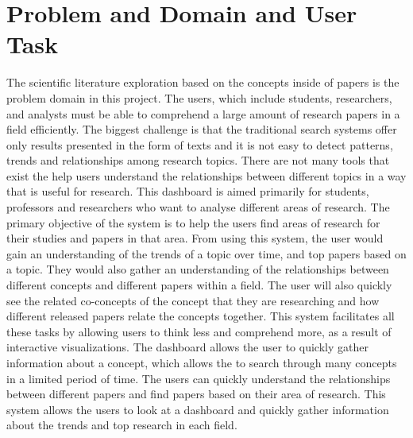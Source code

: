 \documentclass[sigconf]{acmart}
\begin{document}
\section{Problem and Domain and User Task}
The scientific literature exploration based on the concepts inside of papers is the problem domain in this project. The users, which include students, researchers, and analysts must be able to comprehend a large amount of research papers in a field efficiently.  The biggest challenge is that the traditional search systems offer only results presented in the form of texts and it is not easy to detect patterns, trends and relationships among research topics. There are not many tools that exist the help users understand the relationships between different topics in a way that is useful for research.  This dashboard is aimed primarily for students, professors and researchers who want to analyse different areas of research. The primary objective of the system is to help the users find areas of research for their studies and papers in that area. From using this system, the user would gain an understanding of the trends of a topic over time, and top papers based on a topic. They would also gather an understanding of the relationships between different concepts and different papers within a field. The user will also quickly see the related co-concepts of the concept that they are researching and how different released papers relate the concepts together. 
This system facilitates all these tasks by allowing users to think less and comprehend more, as a result of interactive visualizations. The dashboard allows the user to quickly gather information about a concept, which allows the to search through many concepts in a limited period of time. The users can quickly understand the relationships between different papers and find papers based on their area of research.  This system allows the users to look at a dashboard and quickly gather information about the trends and top research in each field. 
\end{document}
